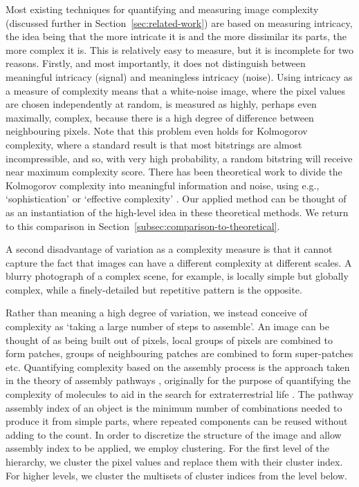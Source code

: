 \documentclass[a4paper,fleqn]{cas-sc}
\theoremstyle{remark}
\begin{document}
Most existing techniques for quantifying and measuring image complexity (discussed further in Section~\ref{sec:related-work}) are based on measuring intricacy, the idea being that the more intricate it is and the more dissimilar its parts, the more complex it is. 
This is relatively easy to measure, but it is incomplete for two reasons. Firstly, and most importantly, it does not distinguish between meaningful intricacy (signal) and meaningless intricacy (noise). Using intricacy as a measure of complexity means that a white-noise image, where the pixel values are chosen independently at random, is measured as highly, perhaps even maximally, complex, because there is a high degree of difference between neighbouring pixels. Note that this problem even holds for Kolmogorov complexity, where a standard result is that most bitstrings are almost incompressible, and so, with very high probability, a random bitstring will receive near maximum complexity score. There has been theoretical work to divide the Kolmogorov complexity into meaningful information and noise, using e.g., `sophistication' \citep{koppel1987complexity,vitanyi2006meaningful} or `effective complexity' \cite{ay2010effective,gell1996information}. Our applied method can be thought of as an instantiation of the high-level idea in these theoretical methods. We return to this comparison in Section~\ref{subsec:comparison-to-theoretical}.

A second disadvantage of variation as a complexity measure is that it cannot capture the fact that images can have a different complexity at different scales. A blurry photograph of a complex scene, for example, is locally simple but globally complex, while a finely-detailed but repetitive pattern is the opposite.

Rather than meaning a high degree of variation, we instead conceive of complexity as `taking a large number of steps to assemble'. An image can be thought of as being built out of pixels, local groups of pixels are combined to form patches, groups of neighbouring patches are combined to form super-patches etc. Quantifying complexity based on the assembly process is the approach taken in the theory of assembly pathways \citep{cronin2006imitation,marshall2019quantifying}, originally for the purpose of quantifying the complexity of molecules to aid in the search for extraterrestrial life \citep{marshall2021identifying,schwieterman2018exoplanet}. The pathway assembly index of an object is the minimum number of combinations needed to produce it from simple parts, where repeated components can be reused without adding to the count. In order to discretize the structure of the image and allow assembly index to be applied, we employ clustering. For the first level of the hierarchy, we cluster the pixel values and replace them with their cluster index. For higher levels, we cluster the multisets of cluster indices from the level below. 
\end{document}
